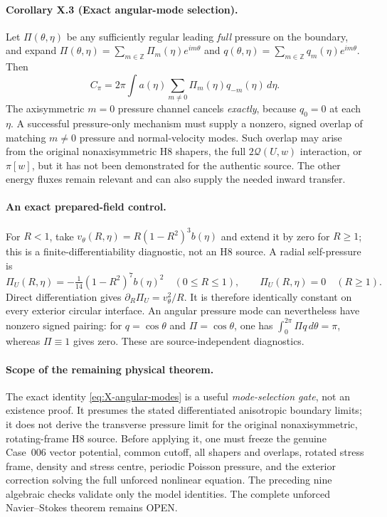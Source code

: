 \paragraph{Corollary X.3 (Exact angular-mode selection).}
Let $\Pi(\theta,\eta)$ be any sufficiently regular leading \emph{full} pressure on the boundary, and expand $\Pi(\theta,\eta)=\sum_{m\in\mathbb Z}\Pi_m(\eta)e^{im\theta}$ and $q(\theta,\eta)=\sum_{m\in\mathbb Z}q_m(\eta)e^{im\theta}$. Then
\begin{equation}\label{eq:X-angular-modes}
 \boxed{C_\pi=2\pi\int a(\eta)\sum_{m\ne0}\Pi_m(\eta)q_{-m}(\eta)\,d\eta.}
\end{equation}
The axisymmetric $m=0$ pressure channel cancels \emph{exactly}, because $q_0=0$ at each $\eta$. A successful pressure-only mechanism must supply a nonzero, signed overlap of matching $m\ne0$ pressure and normal-velocity modes. Such overlap may arise from the original nonaxisymmetric H8 shapers, the full $2\mathcal Q(U,w)$ interaction, or $\pi[w]$, but it has not been demonstrated for the authentic source. The other energy fluxes remain relevant and can also supply the needed inward transfer.

\paragraph{An exact prepared-field control.}
For $R<1$, take $v_\theta(R,\eta)=R(1-R^2)^3b(\eta)$ and extend it by zero for $R\ge1$; this is a finite-differentiability diagnostic, not an H8 source. A radial self-pressure is
\[
 \Pi_U(R,\eta)=-\tfrac1{14}(1-R^2)^7b(\eta)^2\quad(0\le R\le1),
 \qquad \Pi_U(R,\eta)=0\quad(R\ge1).
\]
Direct differentiation gives $\partial_R\Pi_U=v_\theta^2/R$. It is therefore identically constant on every exterior circular interface. An angular pressure mode can nevertheless have nonzero signed pairing: for $q=\cos\theta$ and $\Pi=\cos\theta$, one has $\int_0^{2\pi}\Pi q\,d\theta=\pi$, whereas $\Pi\equiv1$ gives zero. These are source-independent diagnostics.

\paragraph{Scope of the remaining physical theorem.}
The exact identity \eqref{eq:X-angular-modes} is a useful \emph{mode-selection gate}, not an existence proof. It presumes the stated differentiated anisotropic boundary limits; it does not derive the transverse pressure limit for the original nonaxisymmetric, rotating-frame H8 source. Before applying it, one must freeze the genuine Case~006 vector potential, common cutoff, all shapers and overlaps, rotated stress frame, density and stress centre, periodic Poisson pressure, and the exterior correction solving the full unforced nonlinear equation. The preceding nine algebraic checks validate only the model identities. The complete unforced Navier--Stokes theorem remains OPEN.

